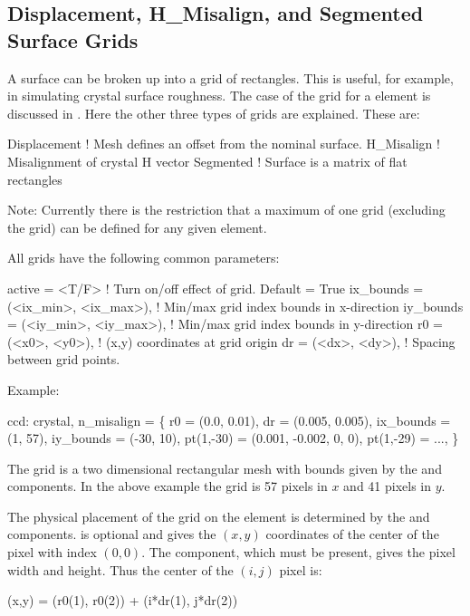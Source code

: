 \subsection{Displacement, H_Misalign, and Segmented Surface Grids}
\label{s:surf.grid}

A surface can be broken up into a grid of rectangles. This is useful, for example, in simulating
crystal surface roughness. The case of the  grid for a  element is discussed
in . Here the other three types of grids are explained. These are:
\begin{example}
  Displacement       ! Mesh defines an offset from the nominal surface.
  H_Misalign         ! Misalignment of crystal H vector
  Segmented          ! Surface is a matrix of flat rectangles
\end{example}
Note: Currently there is the restriction that a maximum of one grid (excluding the  grid)
can be defined for any given element.

All grids have the following common parameters:
\begin{example}
  active = <T/F>                     ! Turn on/off effect of grid. Default = True
  ix_bounds = (<ix_min>, <ix_max>),  ! Min/max grid index bounds in x-direction
  iy_bounds = (<iy_min>, <iy_max>),  ! Min/max grid index bounds in y-direction
  r0 = (<x0>, <y0>),                 ! (x,y) coordinates at grid origin
  dr = (<dx>, <dy>),                 ! Spacing between grid points.
\end{example}

Example:
\begin{example}
  ccd: crystal, n_misalign = \{
            r0 = (0.0, 0.01), dr = (0.005, 0.005),
            ix_bounds = (1, 57), iy_bounds = (-30, 10),
            pt(1,-30) = (0.001, -0.002, 0, 0), 
            pt(1,-29) = ..., 
          \}
\end{example}

The grid is a two dimensional rectangular mesh with bounds given by the  and
 components. In the above example the grid is 57 pixels in $x$ and 41 pixels in $y$.

The physical placement of the grid on the element is determined by the  and 
components.  is optional and gives the $(x,y)$ coordinates of the center of the pixel with
index $(0,0)$. The  component, which must be present, gives the pixel width and height. Thus
the center of the $(i,j)$ pixel is:
\begin{example}
  (x,y) = (r0(1), r0(2)) + (i*dr(1), j*dr(2))
\end{example}

